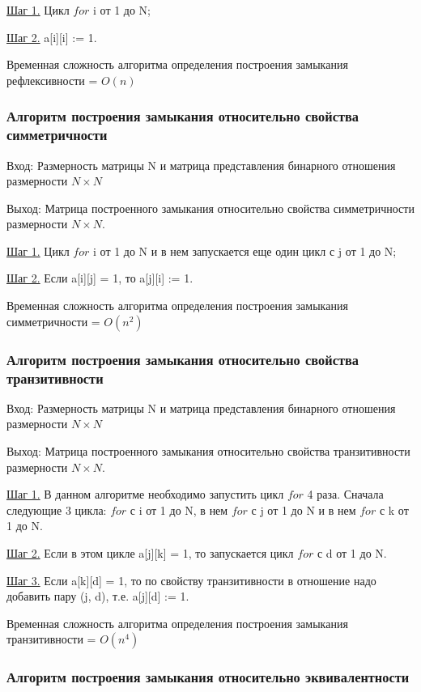 \documentclass[bachelor, och, labwork]{shiza}
\begin{document}
	\underline{Шаг 1.} Цикл $for$ i от 1 до N;
	
	\underline{Шаг 2.} a[i][i] := 1.
	
	Временная сложность алгоритма определения построения замыкания рефлексивности = $O(n)$
	
	
	\subsubsection{Алгоритм построения замыкания относительно свойства симметричности}

	$\textit{Вход:}$ Размерность матрицы N и матрица представления бинарного отношения размерности $N \times N$
	
	$\textit{Выход:}$  Матрица построенного замыкания относительно свойства симметричности размерности $N \times N$.
	
	\underline{Шаг 1.} Цикл $for$ i от 1 до N и в нем запускается еще один цикл с j от 1 до N;
		
	\underline{Шаг 2.} Если a[i][j] = 1, то a[j][i] := 1.
	
	Временная сложность алгоритма определения построения замыкания симметричности = $O(n^2)$
	
	\subsubsection{Алгоритм построения замыкания относительно свойства транзитивности}

	$\textit{Вход:}$ Размерность матрицы N и матрица представления бинарного отношения размерности $N \times N$
	
	$\textit{Выход:}$  Матрица построенного замыкания относительно свойства транзитивности размерности $N \times N$.
	
	\underline{Шаг 1.} В данном алгоритме необходимо запустить цикл $for$ 4 раза. Сначала следующие 3 цикла: $for$ с i от 1 до N, в нем $for$ с j от 1 до N и в нем $for$ с k от 1 до N.
	
	\underline{Шаг 2.} Если в этом цикле a[j][k] = 1, то запускается цикл $for$ с d от 1 до N.
	
	\underline{Шаг 3.} Если a[k][d] = 1, то по свойству транзитивности в отношение надо добавить пару (j, d), т.е. a[j][d] := 1.
	
	Временная сложность алгоритма определения построения замыкания транзитивности = $O(n^4)$
	
	\subsubsection{Алгоритм построения замыкания относительно эквивалентности}
\end{document}
